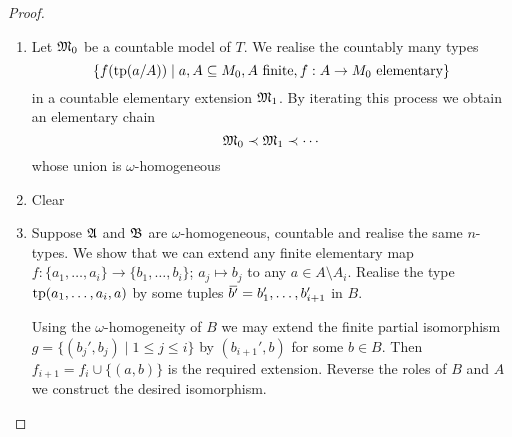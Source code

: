 \documentclass[11pt]{article}
\begin{document}
\begin{proof}
\begin{enumerate}
\item Let \(\mathfrak{M}_0\) be a countable model of \(T\). We realise the countably many types
\begin{equation*}
\{f(\operatorname{tp}(a/A))\mid a,A\subseteq M_0,A\text{ finite},f:A\to M_0\text{ elementary}\}
\end{equation*}
in a countable elementary extension \(\mathfrak{M}_1\). By iterating this process we obtain an elementary
chain
\begin{equation*}
\mathfrak{M}_0\prec\mathfrak{M}_1\prec\cdots
\end{equation*}
whose union is \(\omega\)-homogeneous
\item Clear
\item Suppose \(\mathfrak{A}\) and \(\mathfrak{B}\) are \(\omega\)-homogeneous, countable and realise the same \(n\)-types. We
show that we can extend any finite elementary map \(f:\{a_1,\dots,a_i\}\to\{b_1,\dots,b_i\}\); \(a_j\mapsto b_j\) to
any \(a\in A\setminus A_i\). Realise the type \(\operatorname{tp}(a_1,\dots,a_i,a)\) by some
tuples \(\bbar{b'}=b_1',\dots,b_{i+1}'\) in \(B\).

Using the \(\omega\)-homogeneity of \(B\) we may extend
the finite partial isomorphism \(g=\{(b_j',b_j)\mid 1\le j\le i\}\) by \((b_{i+1}',b)\) for
some \(b\in B\). Then \(f_{i+1}=f_i\cup\{(a,b)\}\) is the required extension. Reverse the roles
of \(B\) and \(A\) we construct the desired isomorphism.
\end{enumerate}
\end{proof}
\end{document}
